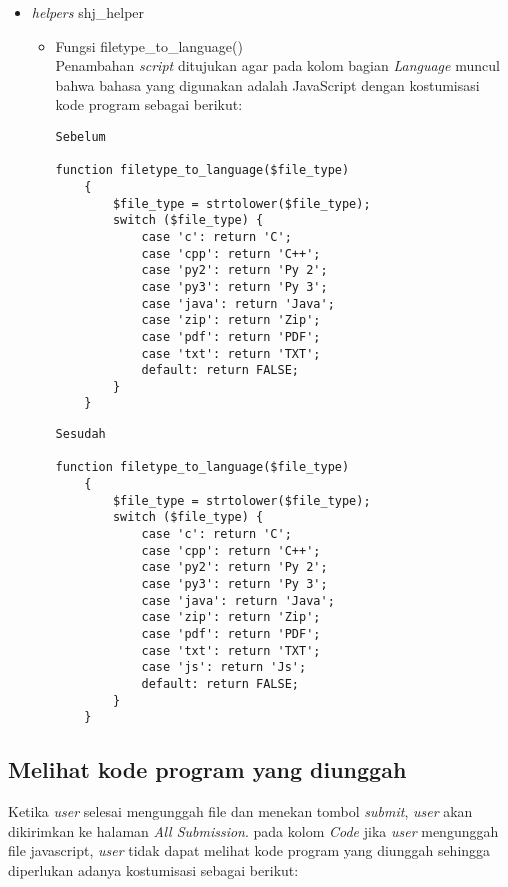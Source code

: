  \begin{itemize}
     \item \textit{helpers} shj\_helper
     \begin{itemize}
        \item Fungsi filetype\_to\_language()\\ Penambahan \textit{script} ditujukan agar pada kolom bagian \textit{Language} muncul bahwa bahasa yang digunakan adalah JavaScript dengan kostumisasi kode program sebagai berikut: 
        
                 \begin{lstlisting}[basicstyle=\ttfamily, frame=single,
    columns=fullflexible, breaklines=true, numbers=none]
Sebelum 

function filetype_to_language($file_type)
	{
		$file_type = strtolower($file_type);
		switch ($file_type) {
			case 'c': return 'C';
			case 'cpp': return 'C++';
			case 'py2': return 'Py 2';
			case 'py3': return 'Py 3';
			case 'java': return 'Java';
			case 'zip': return 'Zip';
			case 'pdf': return 'PDF';
			case 'txt': return 'TXT';
			default: return FALSE;
		}
	}
    \end{lstlisting}

         \begin{lstlisting}[basicstyle=\ttfamily, frame=single,
    columns=fullflexible, breaklines=true, numbers=none]
Sesudah

function filetype_to_language($file_type)
	{
		$file_type = strtolower($file_type);
		switch ($file_type) {
			case 'c': return 'C';
			case 'cpp': return 'C++';
			case 'py2': return 'Py 2';
			case 'py3': return 'Py 3';
			case 'java': return 'Java';
			case 'zip': return 'Zip';
			case 'pdf': return 'PDF';
			case 'txt': return 'TXT';
			case 'js': return 'Js';
			default: return FALSE;
		}
	}
    \end{lstlisting}

     \end{itemize}
 \end{itemize}
 
  \subsection{Melihat kode program yang diunggah}
 \label{sec: Meilihat kode program yang diunggah}
 Ketika \textit{user} selesai mengunggah file dan menekan tombol \textit{submit}, \textit{user} akan dikirimkan ke halaman \textit{All Submission}. pada kolom \textit{Code} jika \textit{user} mengunggah file javascript, \textit{user} tidak dapat melihat kode program yang diunggah sehingga diperlukan adanya kostumisasi sebagai berikut: 
 
